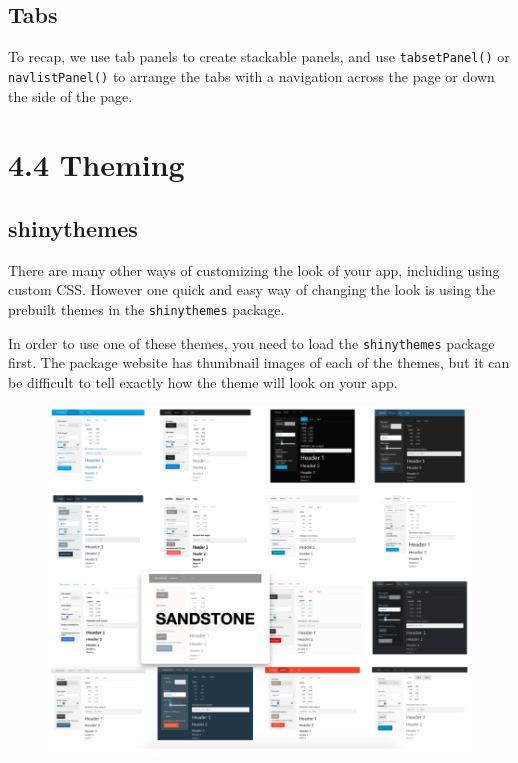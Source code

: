 \documentclass[
  letterpaper,
  DIV=11,
  numbers=noendperiod]{scrreprt}
\begin{document}
\hypertarget{tabs}{%
\subsection{Tabs}\label{tabs}}

To recap, we use tab panels to create stackable panels, and use
\texttt{tabsetPanel()} or \texttt{navlistPanel()} to arrange the tabs
with a navigation across the page or down the side of the page.

\hypertarget{theming}{%
\section{4.4 Theming}\label{theming}}

\hypertarget{shinythemes}{%
\subsection{shinythemes}\label{shinythemes}}

There are many other ways of customizing the look of your app, including
using custom CSS. However one quick and easy way of changing the look is
using the prebuilt themes in the \texttt{shinythemes} package.

In order to use one of these themes, you need to load the
\texttt{shinythemes} package first. The package website has thumbnail
images of each of the themes, but it can be difficult to tell exactly
how the theme will look on your app.

\begin{figure}

{\centering \includegraphics[width=1\textwidth,height=\textheight]{./images/shinythemes.png}

}

\end{figure}
\end{document}
